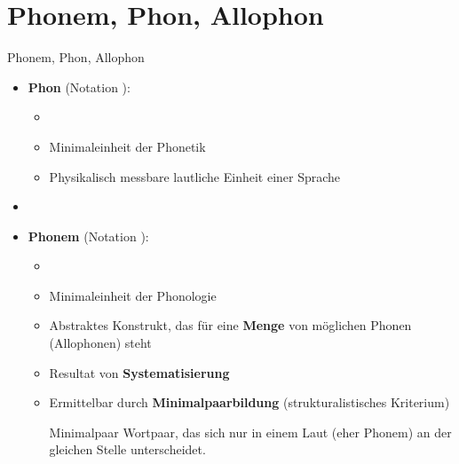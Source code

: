 %
\section{Phonem, Phon, Allophon}

\begin{frame}{Phonem, Phon, Allophon}

\begin{itemize}
	\item \textbf{Phon} (Notation \textipa{[ ]}):
	
	\begin{itemize}
		\item[]
		\item Minimaleinheit der Phonetik
		\item Physikalisch messbare lautliche Einheit einer Sprache
	\end{itemize}
	
	\item[]
	\item \textbf{Phonem} (Notation \textipa{/ /}):
	
	\begin{itemize}
		\item[]
		\item Minimaleinheit der Phonologie
		\item Abstraktes Konstrukt, das für eine \textbf{Menge} von möglichen Phonen (Allophonen) steht
		\item Resultat von \textbf{Systematisierung}
		\item Ermittelbar durch \textbf{Minimalpaarbildung} (strukturalistisches Kriterium)
		
	\begin{block}{Minimalpaar}
Wortpaar, das sich nur in einem Laut (eher Phonem) an der gleichen Stelle unterscheidet.
	\end{block}
	
	\end{itemize}
	
\end{itemize}

\end{frame}



